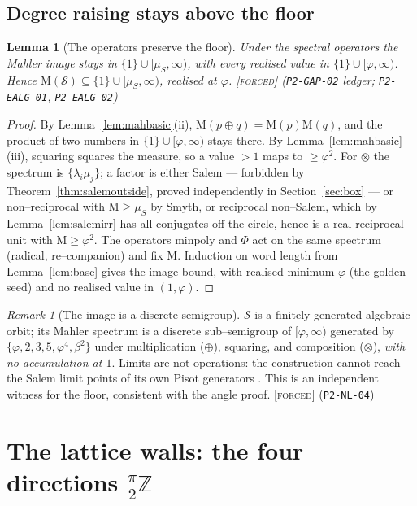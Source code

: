 \documentclass[11pt]{article}
\theoremstyle{plain}
\newtheorem{lemma}[theorem]{Lemma}
\theoremstyle{definition}
\theoremstyle{remark}
\newtheorem{remark}[theorem]{Remark}
\newcommand{\forced}{\textcolor{forcedc}{\textsc{[forced]}}}
\newcommand{\Z}{\mathbb{Z}}
\newcommand{\Mah}{\mathrm{M}}
\newcommand{\Scal}{\mathcal{S}}
\begin{document}
\subsection{Degree raising stays above the floor}
\begin{lemma}[The operators preserve the floor]\label{lem:degraise}
Under the spectral operators the Mahler image stays in $\{1\}\cup[\mu_S,\infty)$, with every realised value in $\{1\}\cup[\varphi,\infty)$. Hence $\Mah(\Scal)\subseteq\{1\}\cup[\mu_S,\infty)$, realised at $\varphi$. \forced{} {\small(\texttt{P2-GAP-02} ledger; \texttt{P2-EALG-01}, \texttt{P2-EALG-02})}
\end{lemma}
\begin{proof}
By Lemma~\ref{lem:mahbasic}(ii), $\Mah(p\oplus q)=\Mah(p)\Mah(q)$, and the product of two numbers in $\{1\}\cup[\varphi,\infty)$ stays there. By Lemma~\ref{lem:mahbasic}(iii), squaring squares the measure, so a value $>1$ maps to $\ge\varphi^2$. For $\otimes$ the spectrum is $\{\lambda_i\mu_j\}$; a factor is either Salem --- forbidden by Theorem~\ref{thm:salemoutside}, proved independently in Section~\ref{sec:box} --- or non--reciprocal with $\Mah\ge\mu_S$ by Smyth, or reciprocal non--Salem, which by Lemma~\ref{lem:salemirr} has all conjugates off the circle, hence is a real reciprocal unit with $\Mah\ge\varphi^2$. The operators $\text{minpoly}$ and $\Phi$ act on the same spectrum (radical, re--companion) and fix $\Mah$. Induction on word length from Lemma~\ref{lem:base} gives the image bound, with realised minimum $\varphi$ (the golden seed) and no realised value in $(1,\varphi)$.
\end{proof}

\begin{remark}[The image is a discrete semigroup]\label{rem:semigroup}
$\Scal$ is a finitely generated algebraic orbit; its Mahler spectrum is a discrete sub--semigroup of $[\varphi,\infty)$ generated by $\{\varphi,2,3,5,\varphi^4,\beta^2\}$ under multiplication ($\oplus$), squaring, and composition ($\otimes$), \emph{with no accumulation at $1$}. Limits are not operations: the construction cannot reach the Salem limit points of its own Pisot generators \cite{Salem}. This is an independent witness for the floor, consistent with the angle proof. \forced{} {\small(\texttt{P2-NL-04})}
\end{remark}

\section{The lattice walls: the four directions \texorpdfstring{$\tfrac{\pi}{2}\Z$}{(pi/2)Z}}\label{sec:walls}
\end{document}
